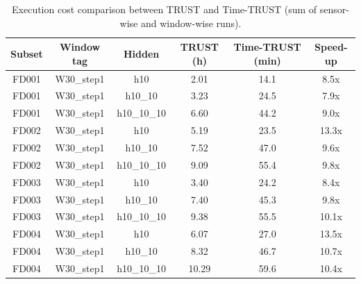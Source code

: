 \begin{table}[t]
\centering
\caption{Execution cost comparison between TRUST and Time-TRUST (sum of sensor-wise and window-wise runs).}
\label{tab:execution_cost_summary}
\begin{tabular}{|c|c|c|c|c|c|}
\hline
Subset & Window tag & Hidden & TRUST (h) & Time-TRUST (min) & Speed-up \\
\hline
FD001 & W30_step1 & h10 & 2.01 & 14.1 & 8.5x \\
\hline
FD001 & W30_step1 & h10_10 & 3.23 & 24.5 & 7.9x \\
\hline
FD001 & W30_step1 & h10_10_10 & 6.60 & 44.2 & 9.0x \\
\hline
FD002 & W30_step1 & h10 & 5.19 & 23.5 & 13.3x \\
\hline
FD002 & W30_step1 & h10_10 & 7.52 & 47.0 & 9.6x \\
\hline
FD002 & W30_step1 & h10_10_10 & 9.09 & 55.4 & 9.8x \\
\hline
FD003 & W30_step1 & h10 & 3.40 & 24.2 & 8.4x \\
\hline
FD003 & W30_step1 & h10_10 & 7.40 & 45.3 & 9.8x \\
\hline
FD003 & W30_step1 & h10_10_10 & 9.38 & 55.5 & 10.1x \\
\hline
FD004 & W30_step1 & h10 & 6.07 & 27.0 & 13.5x \\
\hline
FD004 & W30_step1 & h10_10 & 8.32 & 46.7 & 10.7x \\
\hline
FD004 & W30_step1 & h10_10_10 & 10.29 & 59.6 & 10.4x \\
\hline
\end{tabular}
\end{table}
